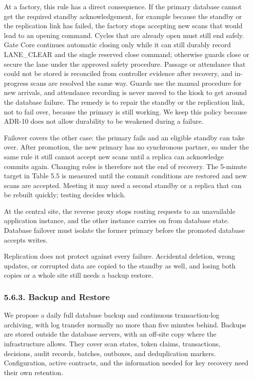 At a factory, this rule has a direct consequence. If the primary database cannot get the required standby acknowledgement, for example because the standby or the replication link has failed, the factory stops accepting new scans that would lead to an opening command. Cycles that are already open must still end safely. Gate Core continues automatic closing only while it can still durably record LANE\_CLEAR and the single reserved close command; otherwise guards close or secure the lane under the approved safety procedure. Passage or attendance that could not be stored is reconciled from controller evidence after recovery, and in-progress scans are resolved the same way. Guards use the manual procedure for new arrivals, and attendance recording is never moved to the kiosk to get around the database failure. The remedy is to repair the standby or the replication link, not to fail over, because the primary is still working. We keep this policy because ADR-10 does not allow durability to be weakened during a failure.


Failover covers the other case: the primary fails and an eligible standby can take over. After promotion, the new primary has no synchronous partner, so under the same rule it still cannot accept new scans until a replica can acknowledge commits again. Changing roles is therefore not the end of recovery. The 5-minute target in Table 5.5 is measured until the commit conditions are restored and new scans are accepted. Meeting it may need a second standby or a replica that can be rebuilt quickly; testing decides which.


At the central site, the reverse proxy stops routing requests to an unavailable application instance, and the other instance carries on from database state. Database failover must isolate the former primary before the promoted database accepts writes.


Replication does not protect against every failure. Accidental deletion, wrong updates, or corrupted data are copied to the standby as well, and losing both copies or a whole site still needs a backup restore.

\subsubsection*{5.6.3. Backup and Restore}

{}

We propose a daily full database backup and continuous transaction-log archiving, with log transfer normally no more than five minutes behind. Backups are stored outside the database servers, with an off-site copy where the infrastructure allows. They cover scan states, token claims, transactions, decisions, audit records, batches, outboxes, and deduplication markers. Configuration, active contracts, and the information needed for key recovery need their own retention.


